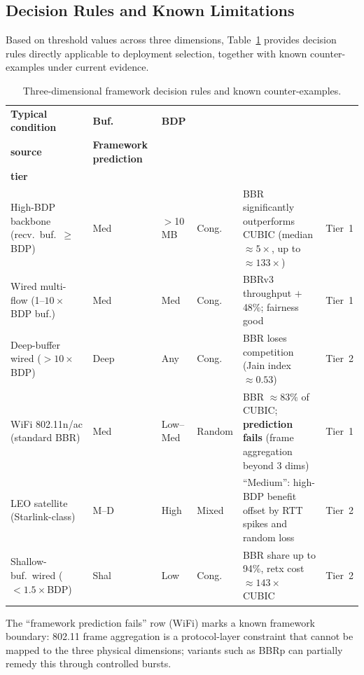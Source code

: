 \documentclass[a4paper,fleqn]{cas-sc}
\begin{document}
\subsection{Decision Rules and Known Limitations}
\label{sec:framework_rules}

Based on threshold values across three dimensions, Table~\ref{tab:decision_rules}
provides decision rules directly applicable to deployment selection, together with
known counter-examples under current evidence.

\begin{table}[pos=tbp]
  \caption{Three-dimensional framework decision rules and known counter-examples.}
  \label{tab:decision_rules}
  \small
  \begin{tabularx}{\tblwidth}{@{}p{3.8cm}p{1.0cm}p{1.3cm}p{1.6cm}Xp{1.3cm}@{}}
    \toprule
    \textbf{Typical condition} & \textbf{Buf.} & \textbf{BDP} & \makecell[l]{\textbf{Loss}\\\textbf{source}}
      & \textbf{Framework prediction} & \makecell[l]{\textbf{Evidence}\\\textbf{tier}} \\
    \midrule
    High-BDP backbone (recv.\ buf.\ $\geq$BDP) & Med & $>$10\,MB & Cong.
      & BBR significantly outperforms CUBIC (median $\approx\!5\times$, up to $\approx\!133\times$) & Tier~1 \\
    \midrule
    Wired multi-flow (1--$10\times$BDP buf.) & Med & Med & Cong.
      & BBRv3 throughput $+$48\%; fairness good & Tier~1 \\
    \midrule
    Deep-buffer wired ($>10\times$BDP) & Deep & Any & Cong.
      & BBR loses competition (Jain index $\approx\!0.53$) & Tier~2 \\
    \midrule
    WiFi 802.11n/ac (standard BBR) & Med & Low--Med & Random
      & BBR $\approx\!83\%$ of CUBIC; \textbf{prediction fails} (frame aggregation beyond 3 dims) & Tier~1 \\
    \midrule
    LEO satellite (Starlink-class) & M--D & High & Mixed
      & ``Medium'': high-BDP benefit offset by RTT spikes and random loss & Tier~2 \\
    \midrule
    Shallow-buf.\ wired ($<1.5\times$BDP) & Shal & Low & Cong.
      & BBR share up to 94\%, retx cost $\approx\!143\times$ CUBIC & Tier~2 \\
    \bottomrule
  \end{tabularx}
  \begin{tablenotes}
    \small
    \item The ``framework prediction fails'' row (WiFi) marks a known framework boundary:
    802.11 frame aggregation is a protocol-layer constraint that cannot be mapped to the
    three physical dimensions; variants such as BBRp can partially remedy this through
    controlled bursts.
  \end{tablenotes}
\end{table}
\end{document}
